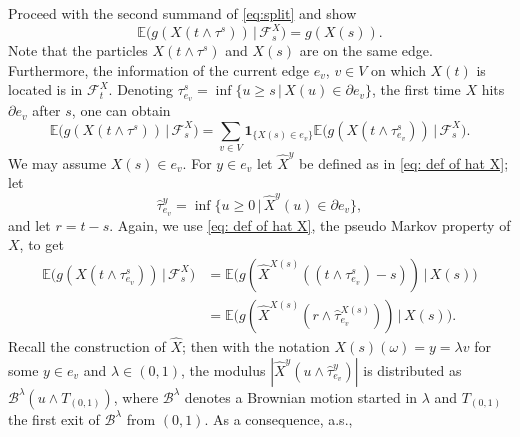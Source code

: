 \documentclass[11pt]{article}
\makeatletter
\renewenvironment{proof}[1][\proofname]{
   \par\pushQED{\qed}\normalfont
   \topsep6\p@\@plus6\p@\relax
   \trivlist\item[\hskip\labelsep\bfseries#1\@addpunct{.}]
   \ignorespaces
}{
   \popQED\endtrivlist\@endpefalse
}
\numberwithin{equation}{section}
\def\Ex{\mathbb{E}}
\def\indicator{\boldsymbol{1}}
\makeatother
\begin{document}
\begin{proof}[Proof of Lemma \ref{L: harmonic on cross}]
  Proceed with the second summand of \eqref{eq:split} and show 
  \begin{equation} \nonumber
    \Ex \big( g(X(t \land \tau^s)) 
    \,\big|\, \mathcal{F}^X_s \big)  = g(X(s)).
  \end{equation}
  Note that the particles $X(t \land \tau^s)$ and 
  $X(s)$ are on the same edge. Furthermore, the 
  information of the current edge $e_v$, $v \in V$ 
  on which  $X(t)$ is located is in $\mathcal{F}^X_t$.
  Denoting $\tau^s_{e_v}= \inf \{u\geq s\,|\, X(u) \in \partial e_v\}$, the 
  first time $X$ hits $\partial e_v$ 
  after $s$, one can obtain 
  \begin{equation} \label{eq: direction out}
    \Ex \big( g(X(t \land \tau^s)) 
    \,\big|\, \mathcal{F}^X_s \big) 
    = \sum_{v \in V} 
      \indicator_{\{X(s) \in e_v\}} 
        \Ex \big( g(X(t \land \tau^s_{e_v}))  
        \,\big|\,
        \mathcal{F}^X_s \big).
  \end{equation}
  We may assume $X(s) \in e_v$.
  For $y \in e_v$ let $\hat{X}^y$ 
  be defined as in \eqref{eq: def of hat X};
  let 
  \begin{equation}\nonumber
    \hat{\tau}^y_{e_v} = 
    \inf \{u\geq 0 \,|\, \hat{X}^y(u) 
          \in \partial e_v \},
  \end{equation}
  and let $r = t-s$.
  Again, we use \eqref{eq: def of hat X}, the pseudo 
  Markov property of $X$, to get  
  \begin{equation} \label{eq: X to Xhat}
  \begin{split}
    \Ex  \big( g( X(t \land \tau^s_{e_v})) \,\big|\,
    \mathcal{F}^X_s \big)
  &= \Ex \big( g(\hat{X}^{X(s)}
                ((t \land \tau^s_{e_v}) -s))
                \,\big|\, X(s) \big)\\
  &= \Ex \big( g( \hat{X}^{X(s)}(
              r \land \hat{\tau}^{X(s)}_{e_v})) 
              \,\big|\, X(s) \big).
  \end{split}
  \end{equation}
  Recall the construction of $\hat{X}$;
  then with the notation 
  $X(s)(\omega) = y = \lambda v$ 
  for some $y \in e_v$ and $\lambda \in (0,1)$, 
  the modulus 
  $|\hat{X}^y(u \land \hat{\tau}^y_{e_v})|$ 
  is distributed as 
  $\mathcal{B}^{\lambda}(u \land T_{(0,1)})$,
  where $\mathcal{B}^{\lambda}$ 
  denotes a Brownian motion started in $\lambda$ 
  and $T_{(0,1)}$ the first 
  exit of $\mathcal{B}^{\lambda}$ from $(0,1)$.
  As a consequence, a.s.,
  \begin{equation}\nonumber
    \begin{split}

\end{split}
\end{equation}
\end{proof}
\end{document}
